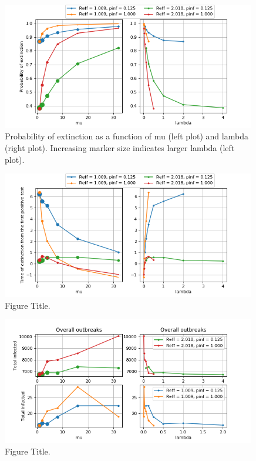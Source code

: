\documentclass[sr]{drdc-report}
\begin{document}
\begin{figure}
  \includegraphics[width=0.99\textwidth, keepaspectratio=true]{figures/pext_exp1}
  \caption{Probability of extinction as a function of mu (left plot) and lambda (right plot). Increasing marker size indicates larger lambda (left plot).}\label{fig_plt_pextExp1}
\end{figure}

\begin{figure}
  \includegraphics[width=0.99\textwidth, keepaspectratio=true]{figures/text_exp1}
  \caption{Figure Title.}\label{fig_plt_textExp1}
\end{figure}

\begin{figure}
  \includegraphics[width=0.99\textwidth, keepaspectratio=true]{figures/Ninf_exp1}
  \caption{Figure Title.}\label{fig_plt_NinfExp1}
\end{figure}
\end{document}
